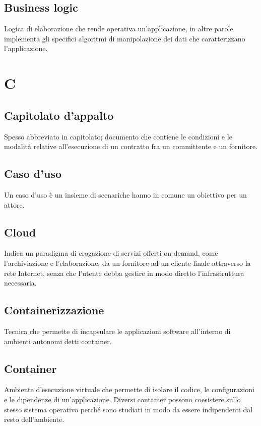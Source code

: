 \subsection*{Business logic}
Logica di elaborazione che rende operativa un'applicazione, in altre parole implementa gli specifici algoritmi di manipolazione dei dati che caratterizzano l’applicazione.

\clearpage
\section*{C}

\subsection*{Capitolato d'appalto}
Spesso abbreviato in capitolato; documento che contiene le condizioni e le modalità relative all'esecuzione di un contratto fra un committente e un fornitore.

\subsection*{Caso d'uso}
Un caso d’uso è un insieme di scenari\glosp che hanno in comune un obiettivo per un attore\glo.

\subsection*{Cloud}
Indica un paradigma di erogazione di servizi offerti on-demand, come l'archiviazione e l'elaborazione, da un fornitore ad un cliente finale attraverso la rete Internet, senza che l'utente debba gestire in modo diretto l'infrastruttura necessaria.

\subsection*{Containerizzazione}
Tecnica che permette di incapsulare le applicazioni software all’interno di ambienti autonomi detti container\glo.

\subsection*{Container}
Ambiente d'esecuzione virtuale che permette di isolare il codice, le configurazioni e le dipendenze di un'applicazione. Diversi container possono coesistere sullo stesso sistema operativo perché sono studiati in modo da essere indipendenti dal resto dell'ambiente.

